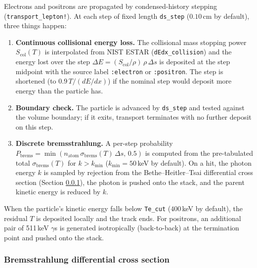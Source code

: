 \documentclass[11pt]{article}
\begin{document}
Electrons and positrons are propagated by condensed-history stepping
(\texttt{transport\_lepton!}). At each step of fixed length \texttt{ds\_step}
($0.10$\,cm by default), three things happen:

\begin{enumerate}[label=\arabic*.]
\item \textbf{Continuous collisional energy loss.} The collisional mass
stopping power $S_{\mathrm{col}}(T)$ is interpolated from NIST ESTAR
(\texttt{dEdx\_collision}) and the energy lost over the step
$\Delta E = (S_{\mathrm{col}}/\rho)\,\rho\,\Delta s$ is deposited at the step
midpoint with the source label \texttt{:electron} or \texttt{:positron}. The
step is shortened (to $0.9\,T/(dE/dx)$) if the nominal step would deposit more
energy than the particle has.
\item \textbf{Boundary check.} The particle is advanced by \texttt{ds\_step}
and tested against the volume boundary; if it exits, transport terminates with
no further deposit on this step.
\item \textbf{Discrete bremsstrahlung.} A per-step probability
$P_{\mathrm{brems}} = \min(n_{\mathrm{atom}}\,\sigma_{\mathrm{brems}}(T)\,\Delta s,\,0.5)$
is computed from the pre-tabulated total $\sigma_{\mathrm{brems}}(T)$ for
$k > k_{\min}$ ($k_{\min} = 50$\,keV by default). On a hit, the photon
energy $k$ is sampled by rejection from the Bethe--Heitler--Tsai differential
cross section (Section \ref{sec:physics-bremsformula}), the photon is pushed
onto the stack, and the parent kinetic energy is reduced by $k$.
\end{enumerate}

When the particle's kinetic energy falls below \texttt{Te\_cut} ($400$\,keV
by default), the residual $T$ is deposited locally and the track ends.
For positrons, an additional pair of 511\,keV $\gamma$s is generated
isotropically (back-to-back) at the termination point and pushed onto the
stack.

\subsubsection{Bremsstrahlung differential cross section}
\label{sec:physics-bremsformula}
\end{document}
